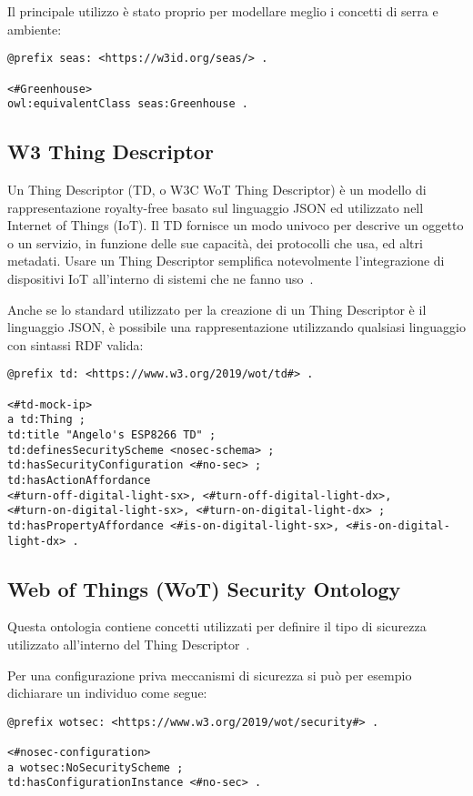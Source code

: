 \noindent Il principale utilizzo è stato proprio per modellare meglio i concetti di serra e ambiente:

\begin{verbatim}
@prefix seas: <https://w3id.org/seas/> .

<#Greenhouse>
owl:equivalentClass seas:Greenhouse .
\end{verbatim}

\subsection{W3 Thing Descriptor}
Un Thing Descriptor (TD, o W3C WoT Thing Descriptor) è un modello di rappresentazione royalty-free basato sul linguaggio JSON ed utilizzato nell Internet of Things (IoT). Il TD fornisce un modo univoco per descrive un oggetto o un servizio, in funzione delle sue capacità, dei protocolli che usa, ed altri metadati. Usare un Thing Descriptor semplifica notevolmente l’integrazione di dispositivi IoT all’interno di sistemi che ne fanno uso~\cite{ThingDes54:online}.

\noindent Anche se lo standard utilizzato per la creazione di un Thing Descriptor è il linguaggio JSON, è possibile una rappresentazione utilizzando qualsiasi linguaggio con sintassi RDF valida:
\begin{verbatim}
@prefix td: <https://www.w3.org/2019/wot/td#> .

<#td-mock-ip>
a td:Thing ;
td:title "Angelo's ESP8266 TD" ;
td:definesSecurityScheme <nosec-schema> ;
td:hasSecurityConfiguration <#no-sec> ;
td:hasActionAffordance
<#turn-off-digital-light-sx>, <#turn-off-digital-light-dx>,
<#turn-on-digital-light-sx>, <#turn-on-digital-light-dx> ;
td:hasPropertyAffordance <#is-on-digital-light-sx>, <#is-on-digital-light-dx> .
\end{verbatim}
\subsection{Web of Things (WoT) Security Ontology}
Questa ontologia contiene concetti utilizzati per definire il tipo di sicurezza utilizzato all'interno del Thing Descriptor~\cite{WebofThi54:online}.

\noindent Per una configurazione priva meccanismi di sicurezza si può per esempio dichiarare un individuo come segue:
\begin{verbatim}
@prefix wotsec: <https://www.w3.org/2019/wot/security#> .

<#nosec-configuration>
a wotsec:NoSecurityScheme ;
td:hasConfigurationInstance <#no-sec> .
\end{verbatim}
